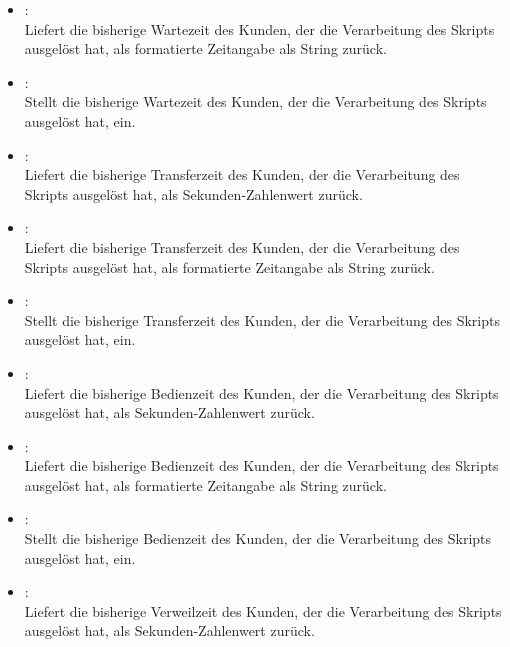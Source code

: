 \begin{itemize}
\item
{}:\\
Liefert die bisherige Wartezeit des Kunden, der die Verarbeitung des Skripts ausgelöst hat, als formatierte Zeitangabe als String zurück.
  
\item
{}:\\
Stellt die bisherige Wartezeit des Kunden, der die Verarbeitung des Skripts ausgelöst hat, ein.
  
\item
{}:\\
Liefert die bisherige Transferzeit des Kunden, der die Verarbeitung des Skripts ausgelöst hat, als Sekunden-Zahlenwert zurück.
  
\item
{}:\\
Liefert die bisherige Transferzeit des Kunden, der die Verarbeitung des Skripts ausgelöst hat, als formatierte Zeitangabe als String zurück.
  
\item
{}:\\
Stellt die bisherige Transferzeit des Kunden, der die Verarbeitung des Skripts ausgelöst hat, ein.
  
\item
{}:\\
Liefert die bisherige Bedienzeit des Kunden, der die Verarbeitung des Skripts ausgelöst hat, als Sekunden-Zahlenwert zurück.
  
\item
{}:\\
Liefert die bisherige Bedienzeit des Kunden, der die Verarbeitung des Skripts ausgelöst hat, als formatierte Zeitangabe als String zurück.
  
\item
{}:\\
Stellt die bisherige Bedienzeit des Kunden, der die Verarbeitung des Skripts ausgelöst hat, ein.

\item
{}:\\
Liefert die bisherige Verweilzeit des Kunden, der die Verarbeitung des Skripts ausgelöst hat, als Sekunden-Zahlenwert zurück.


\end{itemize}
